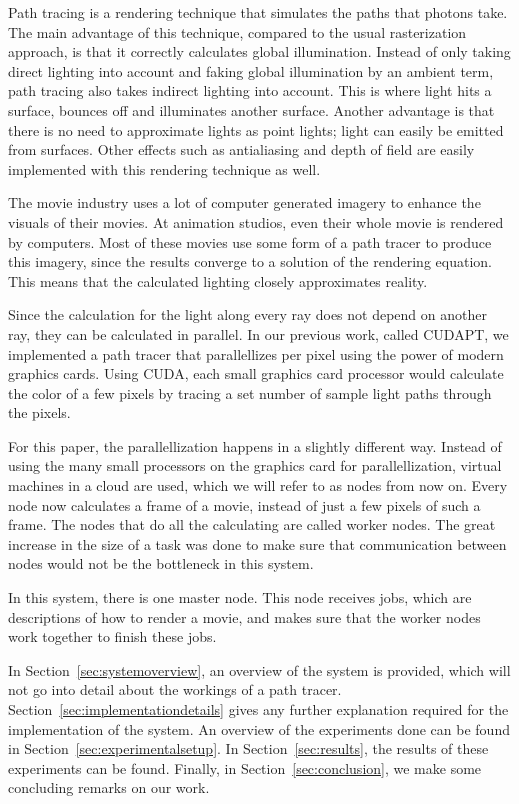 Path tracing is a rendering technique that simulates the paths that photons take.
The main advantage of this technique, compared to the usual rasterization approach, is that it correctly calculates global illumination.
Instead of only taking direct lighting into account and faking global illumination by an ambient term, path tracing also takes indirect lighting into account.
This is where light hits a surface, bounces off and illuminates another surface.
Another advantage is that there is no need to approximate lights as point lights; light can easily be emitted from surfaces.
Other effects such as antialiasing and depth of field are easily implemented with this rendering technique as well.

The movie industry uses a lot of computer generated imagery to enhance the visuals of their movies.
At animation studios, even their whole movie is rendered by computers.
Most of these movies use some form of a path tracer to produce this imagery, since the results converge to a solution of the rendering equation\cite{kajiya}.
This means that the calculated lighting closely approximates reality.

Since the calculation for the light along every ray does not depend on another ray, they can be calculated in parallel.
In our previous work, called CUDAPT\cite{cudapt}, we implemented a path tracer that parallellizes per pixel using the power of modern graphics cards.
Using CUDA, each small graphics card processor would calculate the color of a few pixels by tracing a set number of sample light paths through the pixels.

For this paper, the parallellization happens in a slightly different way.
Instead of using the many small processors on the graphics card for parallellization, virtual machines in a cloud are used, which we will refer to as nodes from now on.
Every node now calculates a frame of a movie, instead of just a few pixels of such a frame.
The nodes that do all the calculating are called worker nodes.
The great increase in the size of a task was done to make sure that communication between nodes would not be the bottleneck in this system.

In this system, there is one master node.
This node receives jobs, which are descriptions of how to render a movie, and makes sure that the worker nodes work together to finish these jobs.

In Section~\ref{sec:systemoverview}, an overview of the system is provided, which will not go into detail about the workings of a path tracer.
Section~\ref{sec:implementationdetails} gives any further explanation required for the implementation of the system.
An overview of the experiments done can be found in Section~\ref{sec:experimentalsetup}.
In Section~\ref{sec:results}, the results of these experiments can be found.
Finally, in Section~\ref{sec:conclusion}, we make some concluding remarks on our work.
